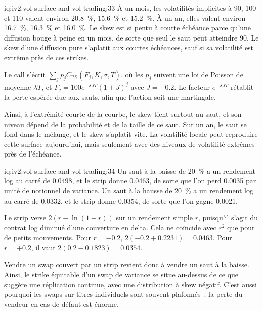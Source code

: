\begin{solution}{iq:iv2:vol-surface-and-vol-trading:33}
À un mois, les volatilités implicites à 90, 100 et 110 valent environ 20.8~\%, 15.6~\% et 15.2~\%. À un an, elles valent environ 16.7~\%, 16.3~\% et 16.0~\%. Le skew est si pentu à courte échéance parce qu'une diffusion bouge à peine en un mois, de sorte que seul le saut peut atteindre 90. Le skew d'une diffusion pure s'aplatit aux courtes échéances, sauf si sa volatilité est extrême près de ces strikes.

Le call s'écrit $\sum_jp_jC_{\text{BS}}(F_j, K, \sigma, T)$, où les $p_j$ suivent une loi de Poisson de moyenne $\lambda T$, et $F_j = 100e^{-\lambda JT}(1 + J)^j$ avec $J = -0.2$. Le facteur $e^{-\lambda JT}$ rétablit la perte espérée due aux sauts, afin que l'action soit une martingale.

Ainsi, à l'extrémité courte de la courbe, le skew tient surtout au saut, et son niveau dépend de la probabilité et de la taille de ce saut. Sur un an, le saut se fond dans le mélange, et le skew s'aplatit vite. La volatilité locale peut reproduire cette surface aujourd'hui, mais seulement avec des niveaux de volatilité extrêmes près de l'échéance.

\end{solution}

\begin{solution}{iq:iv2:vol-surface-and-vol-trading:34}
Un saut à la baisse de 20~\% a un rendement log au carré de 0.0498, et le strip donne 0.0463, de sorte que l'on perd 0.0035 par unité de notionnel de variance. Un saut à la hausse de 20~\% a un rendement log au carré de 0.0332, et le strip donne 0.0354, de sorte que l'on gagne 0.0021.

Le strip verse $2(r - \ln(1 + r))$ sur un rendement simple $r$, puisqu'il s'agit du contrat log diminué d'une couverture en delta. Cela ne coïncide avec $r^2$ que pour de petits mouvements. Pour $r = -0.2$, $2(-0.2 + 0.2231) = 0.0463$. Pour $r = +0.2$, il vaut $2(0.2 - 0.1823) = 0.0354$.

Vendre un swap couvert par un strip revient donc à vendre un saut à la baisse. Ainsi, le strike équitable d'un swap de variance se situe au-dessus de ce que suggère une réplication continue, avec une distribution à skew négatif. C'est aussi pourquoi les swaps sur titres individuels sont souvent plafonnés~: la perte du vendeur en cas de défaut est énorme.

\end{solution}

